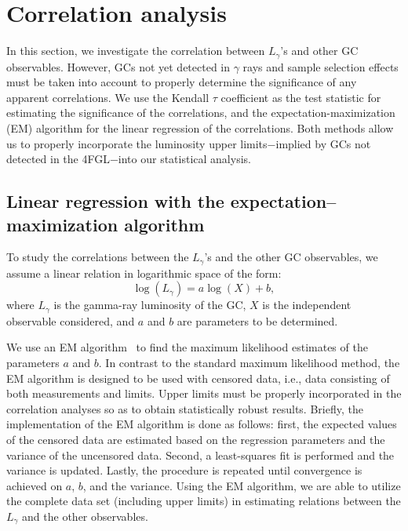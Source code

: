 \documentclass[doublespace,draft,nopageskip]{VTthesis} %
\begin{document}
\section{Correlation analysis}\label{sec:correlation}

In this section, we investigate the correlation between $L_\gamma$'s and other GC observables. However, GCs not yet detected in $\gamma$ rays and sample selection effects must be taken into account to properly determine the significance of any apparent correlations. We use the Kendall $\tau$ coefficient as the test statistic for estimating the significance of the correlations, and the expectation-maximization (EM) algorithm for the linear regression of the correlations. Both methods allow us to properly incorporate the luminosity upper limits$-$implied by GCs not detected in the 4FGL$-$into our statistical analysis.

\subsection{Linear regression with the expectation–maximization algorithm}\label{sec:EM}

To study the correlations between the $L_\gamma$'s and the other GC observables, we assume a linear relation in logarithmic space of the form:
\begin{equation}
    \log(L_\gamma) = a\log(X)+b,
\end{equation}
where $L_\gamma$ is the gamma-ray luminosity of the GC, $X$ is the independent observable considered, and $a$ and $b$ are parameters to be determined. 

We use an EM algorithm~\citep{1985ApJ...293..192F,1986ApJ...306..490I,1992BAAS...24..839L} to find the maximum likelihood estimates of the parameters $a$ and $b$. In contrast to the standard maximum likelihood method, the EM algorithm is designed to be used with censored data, i.e., data consisting of both measurements and limits. Upper limits must be properly incorporated in the correlation analyses so as to obtain statistically robust results. Briefly, the implementation of the EM algorithm is done as follows: first, the expected values of the censored data are estimated based on the regression parameters and the variance of the uncensored data. Second, a least-squares fit is performed and the variance is updated. Lastly, the procedure is repeated until convergence is achieved on $a$, $b$, and the variance. Using the EM algorithm, we are able to utilize the complete data set (including upper limits) in estimating relations between the $L_\gamma$ and the other observables.
\end{document}
